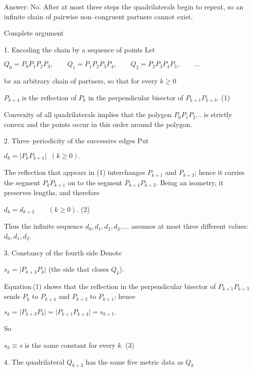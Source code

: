 Answer:  No.  
After at most three steps the quadrilaterals begin to repeat, so an
infinite chain of pairwise non–congruent partners cannot exist.

Complete argument  

1.  Encoding the chain by a sequence of points  
   Let  

            \(Q_{0}=P _0P _1P _2P _3 ,\qquad   
            Q_{1}=P _1P _2P _3P _4 ,\qquad   
            Q_{2}=P _2P _3P _4P _5 ,\qquad \dots \)

   be an arbitrary chain of partners, so that for every
   \(k\ge 0\)

            \(P _{k+4}\) is the reflection of \(P _k\) in the
            perpendicular bisector of \(P _{k+1}P _{k+3}\).     (1)

   Convexity of all quadrilaterals implies that the polygon
   \(P _0P _1P _2\dots\) is strictly
   convex and the points occur in this order around the polygon.

2.  Three–periodicity of the successive edges  
   Put  

            \(d_k=\lvert P _kP _{k+1}\rvert\;\;(k\ge 0).\)

   The reflection that appears in (1) interchanges  
   \(P _{k+1}\) and \(P _{k+3}\); hence it carries the segment
   \(P _kP _{k+1}\) on to the segment \(P _{k+4}P _{k+3}\).
   Being an isometry, it preserves lengths, and therefore  

            \(d_k=d_{k+3}\qquad(k\ge 0).\)                                (2)

   Thus the infinite sequence \(d_0,d_1,d_2,d_3,\dots\)
   assumes at most three different values:
   \(d_0,d_1,d_2\).

3.  Constancy of the fourth side  
   Denote  

            \(s_k=\lvert P _{k+3}P _k\rvert \)  (the side that closes
   \(Q_k\)).  

   Equation (1) shows that the reflection in the perpendicular
   bisector of \(P _{k+1}P _{k+3}\) sends \(P _k\) to \(P _{k+4}\)
   and \(P _{k+3}\) to \(P _{k+1}\); hence  

            \(s_k=\lvert P _{k+3}P _k\rvert
                =\lvert P _{k+1}P _{k+4}\rvert=s_{k+1}.\)

   So  

            \(s_k\equiv s\) is the same constant for every \(k\).     (3)

4.  The quadrilateral \(Q_{k+3}\) has the same five metric data as
    \(Q_k\)  

